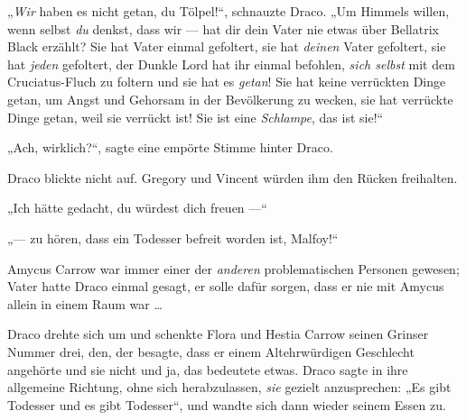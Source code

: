 „\emph{Wir} haben es nicht getan, du Tölpel!“, schnauzte Draco.
„Um Himmels willen, wenn selbst \emph{du} denkst, dass wir — hat dir dein Vater nie etwas über Bellatrix Black erzählt? Sie hat Vater einmal gefoltert, sie hat \emph{deinen} Vater gefoltert, sie hat \emph{jeden} gefoltert, der Dunkle Lord hat ihr einmal befohlen, \emph{sich selbst} mit dem Cruciatus-Fluch zu foltern und sie hat es \emph{getan}! Sie hat keine verrückten Dinge getan, um Angst und Gehorsam in der Bevölkerung zu wecken, sie hat verrückte Dinge getan, weil sie verrückt ist! Sie ist eine \emph{Schlampe}, das ist sie!“

„Ach, wirklich?“, sagte eine empörte Stimme hinter Draco.

Draco blickte nicht auf. Gregory und Vincent würden ihm den Rücken freihalten.

„Ich hätte gedacht, du würdest dich freuen —“

„— zu hören, dass ein Todesser befreit worden ist, Malfoy!“

Amycus Carrow war immer einer der \emph{anderen} problematischen Personen gewesen; Vater hatte Draco einmal gesagt, er solle dafür sorgen, dass er nie mit Amycus allein in einem Raum war …

Draco drehte sich um und schenkte Flora und Hestia Carrow seinen Grinser Nummer drei, den, der besagte, dass er einem Altehrwürdigen Geschlecht angehörte und sie nicht und ja, das bedeutete etwas. Draco sagte in ihre allgemeine Richtung, ohne sich herabzulassen, \emph{sie} gezielt anzusprechen:
„Es gibt Todesser und es gibt Todesser“, und wandte sich dann wieder seinem Essen zu.

